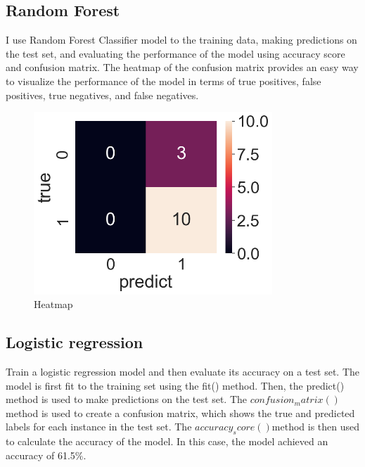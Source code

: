 \documentclass{article}
\begin{document}
\subsection{Random Forest }
 I use Random Forest Classifier model to the training data, making predictions on the test set, and evaluating the performance of the model using accuracy score and confusion matrix. The heatmap of the confusion matrix provides an easy way to visualize the performance of the model in terms of true positives, false positives, true negatives, and false negatives.




 
\begin{figure}[h!]
  \centering
  \includegraphics[width=0.8\textwidth]{heatmap.png}
  \caption{Heatmap}
\end{figure}

\pagebreak
\subsection{Logistic regression}
Train a logistic regression model and then evaluate its accuracy on a test set. The model is first fit to the training set using the fit() method. Then, the predict() method is used to make predictions on the test set. The $confusion_matrix()$ method is used to create a confusion matrix, which shows the true and predicted labels for each instance in the test set. The $accuracy_score() $method is then used to calculate the accuracy of the model. In this case, the model achieved an accuracy of 61.5\%.
\end{document}
